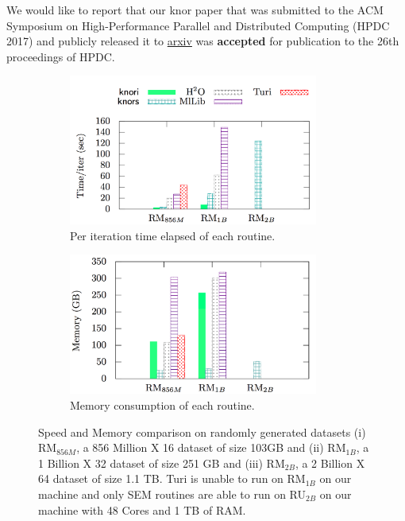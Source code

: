 \documentclass[simplex.tex]{subfiles}
\begin{document}
We would like to report that our \textsf{knor} paper that was submitted
to the ACM Symposium on High-Performance Parallel and Distributed Computing (HPDC 2017)
and publicly released it to \href{https://arxiv.org/abs/1606.08905}{arxiv}
was \textbf{accepted} for publication to the 26th proceedings of HPDC.


\begin{figure}[!h]
\begin{cframed}
\centering
    \footnotesize
    \begin{subfigure}{1\textwidth}
    \centering
    \includegraphics[width=0.9\textwidth]{../../figs/perf.iter.rmvm.png}
    \caption{Per iteration time elapsed of each routine.}
    \label{fig:perf-rmvm}
    \end{subfigure}

    \begin{subfigure}{1\textwidth}
    \centering
    \includegraphics[width=0.9\textwidth]{../../figs/mem.rmvm.png}
    \caption{Memory consumption of each routine.}
    \label{fig:mem-rmvm}
    \end{subfigure}
    \caption{Speed and Memory comparison on randomly generated datasets
        (i) RM$_{856M}$, a 856 Million X 16 dataset of size 103GB and
        (ii) RM$_{1B}$, a 1 Billion X 32 dataset of size 251 GB and (iii) RM$_{2B}$,
        a 2 Billion X 64 dataset of size 1.1 TB. Turi is unable to run on RM$_{1B}$
        on our machine and only SEM routines are able to run on RU$_{2B}$ on our
    machine with 48 Cores and 1 TB of RAM.}
    \label{fig:rmvm}
\end{cframed}
\end{figure}
\clearpage

\end{document}
